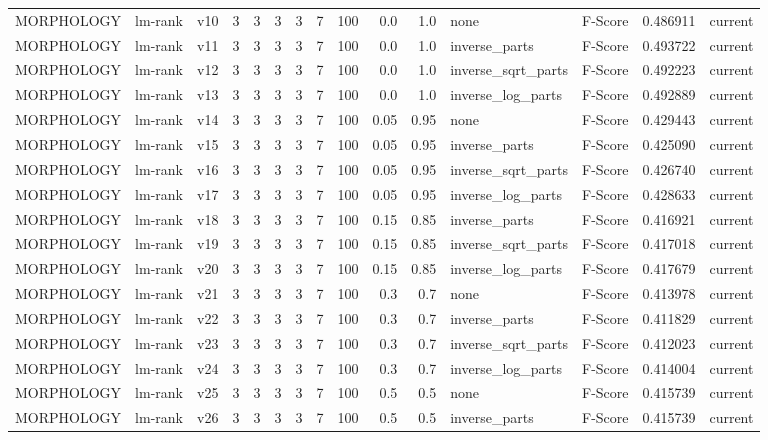 \documentclass{article}
\begin{document}
\begin{xltabular}{\linewidth}{@{}lYcrrrrrrrrYlrl@{}}
MORPHOLOGY & lm-rank & v10 & 3 & 3 & 3 & 3 & 7 & 100 & 0.0 & 1.0 & none & F-Score & 0.486911 & current \\
MORPHOLOGY & lm-rank & v11 & 3 & 3 & 3 & 3 & 7 & 100 & 0.0 & 1.0 & inverse\_parts & F-Score & 0.493722 & current \\
MORPHOLOGY & lm-rank & v12 & 3 & 3 & 3 & 3 & 7 & 100 & 0.0 & 1.0 & inverse\_sqrt\_parts & F-Score & 0.492223 & current \\
MORPHOLOGY & lm-rank & v13 & 3 & 3 & 3 & 3 & 7 & 100 & 0.0 & 1.0 & inverse\_log\_parts & F-Score & 0.492889 & current \\
MORPHOLOGY & lm-rank & v14 & 3 & 3 & 3 & 3 & 7 & 100 & 0.05 & 0.95 & none & F-Score & 0.429443 & current \\
MORPHOLOGY & lm-rank & v15 & 3 & 3 & 3 & 3 & 7 & 100 & 0.05 & 0.95 & inverse\_parts & F-Score & 0.425090 & current \\
MORPHOLOGY & lm-rank & v16 & 3 & 3 & 3 & 3 & 7 & 100 & 0.05 & 0.95 & inverse\_sqrt\_parts & F-Score & 0.426740 & current \\
MORPHOLOGY & lm-rank & v17 & 3 & 3 & 3 & 3 & 7 & 100 & 0.05 & 0.95 & inverse\_log\_parts & F-Score & 0.428633 & current \\
MORPHOLOGY & lm-rank & v18 & 3 & 3 & 3 & 3 & 7 & 100 & 0.15 & 0.85 & inverse\_parts & F-Score & 0.416921 & current \\
MORPHOLOGY & lm-rank & v19 & 3 & 3 & 3 & 3 & 7 & 100 & 0.15 & 0.85 & inverse\_sqrt\_parts & F-Score & 0.417018 & current \\
MORPHOLOGY & lm-rank & v20 & 3 & 3 & 3 & 3 & 7 & 100 & 0.15 & 0.85 & inverse\_log\_parts & F-Score & 0.417679 & current \\
MORPHOLOGY & lm-rank & v21 & 3 & 3 & 3 & 3 & 7 & 100 & 0.3 & 0.7 & none & F-Score & 0.413978 & current \\
MORPHOLOGY & lm-rank & v22 & 3 & 3 & 3 & 3 & 7 & 100 & 0.3 & 0.7 & inverse\_parts & F-Score & 0.411829 & current \\
MORPHOLOGY & lm-rank & v23 & 3 & 3 & 3 & 3 & 7 & 100 & 0.3 & 0.7 & inverse\_sqrt\_parts & F-Score & 0.412023 & current \\
MORPHOLOGY & lm-rank & v24 & 3 & 3 & 3 & 3 & 7 & 100 & 0.3 & 0.7 & inverse\_log\_parts & F-Score & 0.414004 & current \\
MORPHOLOGY & lm-rank & v25 & 3 & 3 & 3 & 3 & 7 & 100 & 0.5 & 0.5 & none & F-Score & 0.415739 & current \\
MORPHOLOGY & lm-rank & v26 & 3 & 3 & 3 & 3 & 7 & 100 & 0.5 & 0.5 & inverse\_parts & F-Score & 0.415739 & current \\

\end{xltabular}
\end{document}
